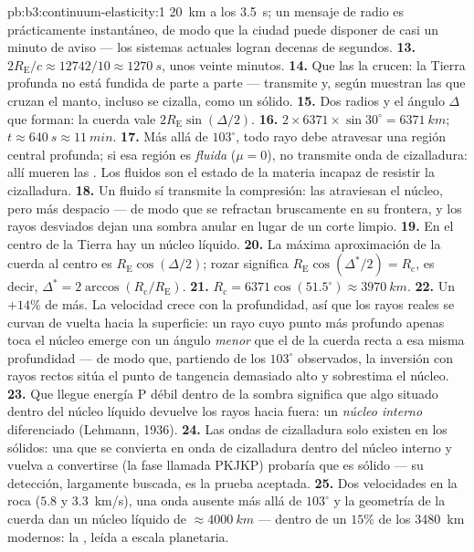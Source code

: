 \begin{solution}{pb:b3:continuum-elasticity:1}
\qty{20}{km} a los \qty{3.5}{s}; un mensaje de radio es prácticamente
instantáneo, de modo que la ciudad puede disponer de casi un minuto de
aviso --- los sistemas actuales logran decenas de segundos.
\textbf{13.} $2R_{\text{E}}/c \approx 12742/10 \approx \qty{1270}{s}$,
unos veinte minutos.
\textbf{14.} Que las  la crucen: la Tierra profunda no está
fundida de parte a parte --- transmite y, según muestran las  que
cruzan el manto, incluso se cizalla, como un sólido.
\textbf{15.} Dos radios y el ángulo $\Delta$ que forman: la cuerda vale
$2R_{\text{E}}\sin(\Delta/2)$.
\textbf{16.} $2 \times 6371 \times \sin30^\circ = \qty{6371}{km}$;
$t \approx \qty{640}{s} \approx \qty{11}{min}$.
\textbf{17.} Más allá de $103^\circ$, todo rayo debe atravesar una región
central profunda; si esa región es \emph{fluida} ($\mu = 0$), no transmite
onda de cizalladura: allí mueren las . Los fluidos son el estado de
la materia incapaz de resistir la cizalladura.
\textbf{18.} Un fluido sí transmite la compresión: las  atraviesan
el núcleo, pero más despacio --- de modo que se refractan bruscamente en su
frontera, y los rayos desviados dejan una sombra anular en lugar de un
corte limpio.
\textbf{19.} En el centro de la Tierra hay un núcleo líquido.
\textbf{20.} La máxima aproximación de la cuerda al centro es
$R_{\text{E}}\cos(\Delta/2)$; rozar significa
$R_{\text{E}}\cos(\Delta^*/2) = R_{\text{c}}$, es decir, $\Delta^* =
2\arccos(R_{\text{c}}/R_{\text{E}})$.
\textbf{21.} $R_{\text{c}} = 6371\cos(51.5^\circ) \approx
\qty{3970}{km}$.
\textbf{22.} Un $+14\%$ de más. La velocidad crece con la profundidad, así
que los rayos reales se curvan de vuelta hacia la superficie: un rayo cuyo
punto más profundo apenas toca el núcleo emerge con un ángulo \emph{menor}
que el de la cuerda recta a esa misma profundidad --- de modo que, partiendo
de los $103^\circ$ observados, la inversión con rayos rectos sitúa el punto
de tangencia demasiado alto y sobrestima el núcleo.
\textbf{23.} Que llegue energía P débil dentro de la sombra significa que
algo situado dentro del núcleo líquido devuelve los rayos hacia fuera: un
\emph{núcleo interno} diferenciado (Lehmann, 1936).
\textbf{24.} Las ondas de cizalladura solo existen en los sólidos: una  que se convierta en onda de cizalladura dentro del núcleo interno y vuelva
a convertirse (la fase llamada PKJKP) probaría que es sólido --- su
detección, largamente buscada, es la prueba aceptada.
\textbf{25.} Dos velocidades en la roca ($5.8$ y \qty{3.3}{km/s}), una onda
ausente más allá de $103^\circ$ y la geometría de la cuerda dan un núcleo
líquido de $\approx\qty{4000}{km}$ --- dentro de un $15\%$ de los
\qty{3480}{km} modernos: la , leída a escala planetaria.
\end{solution}
